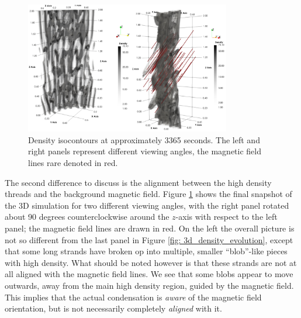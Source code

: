 \begin{figure}[t]
  \centering
  \includegraphics[width=0.8\textwidth]{3d_density_final.png}
  \caption{
    Density isocontours at approximately 3365 seconds. The left and right panels represent different viewing angles, the magnetic field lines rare denoted in red.
  }
  \label{fig: 3d_density_final}
\end{figure}

The second difference to discuss is the alignment between the high density threads and the background magnetic field. Figure \ref{fig: 3d_density_final} shows the final snapshot of the 3D simulation for two different viewing angles, with the right panel rotated about 90 degrees counterclockwise around the $z$-axis with respect to the left panel; the magnetic field lines are drawn in red. On the left the overall picture is not so different from the last panel in Figure \ref{fig: 3d_density_evolution}, except that some long strands have broken op into multiple, smaller ``blob''-like pieces with high density. What should be noted however is that these strands are not at all aligned with the magnetic field lines. We see that some blobs appear to move outwards, away from the main high density region, guided by the magnetic field. This implies that the actual condensation is \emph{aware} of the magnetic field orientation, but is not necessarily completely \emph{aligned} with it.

